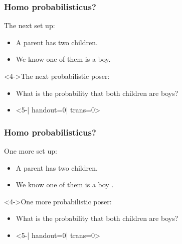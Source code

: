 \begin{frame}
\frametitle{Homo probabilisticus?}

\begin{block}{The next set up:}
  \begin{itemize}
  \item<2->
    A parent has two children.
  \item<3->
    We know one of them is a boy.
  \end{itemize}
\end{block}

\begin{block}<4->{The next probabilistic poser:}
  \begin{itemize}
  \item<4->
    What is the probability that both
    children are boys?
  \item<5-| handout=0| trans=0>
  \end{itemize}
\end{block}
\end{frame}


\begin{frame}
  \frametitle{Homo probabilisticus?}

  \begin{block}{One more set up:}
    \begin{itemize}
    \item<2->
      A parent has two children.
    \item<3->
      We know one of them is a boy .
    \end{itemize}
  \end{block}
  
  \begin{block}<4->{One more probabilistic poser:}
    \begin{itemize}
    \item<4->
      What is the probability that both
      children are boys?
    \item<5-| handout=0| trans=0>
    \end{itemize}
  \end{block}

\end{frame}


